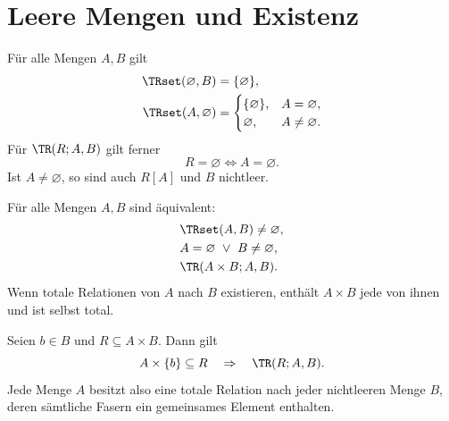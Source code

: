 \section{Leere Mengen und Existenz}

\begin{theorem}
\label{b04guide:thm:empty}
Für alle Mengen $A,B$ gilt
\[
 \begin{aligned}
 \TRset(\varnothing,B)&=\{\varnothing\},\\
 \TRset(A,\varnothing)&=
 \begin{cases}
   \{\varnothing\},& A=\varnothing,\\
   \varnothing,& A\ne\varnothing.
 \end{cases}
 \end{aligned}
\]
Für $\TR(R;A,B)$ gilt ferner
\[
 R=\varnothing\Longleftrightarrow A=\varnothing.
\]
Ist $A\ne\varnothing$, so sind auch $R[A]$ und $B$ nichtleer.
\end{theorem}

\begin{theorem}
\label{b04guide:thm:existence}
Für alle Mengen $A,B$ sind äquivalent:
\[
 \begin{aligned}
 &\TRset(A,B)\ne\varnothing,\\
 &A=\varnothing\ \lor\ B\ne\varnothing,\\
 &\TR(A\times B;A,B).
 \end{aligned}
\]
Wenn totale Relationen von $A$ nach $B$ existieren, enthält
$A\times B$ jede von ihnen und ist selbst total.
\end{theorem}

\begin{theorem}
\label{b04guide:thm:constant}
Seien $b\in B$ und $R\subseteq A\times B$. Dann gilt
\[
 A\times\{b\}\subseteq R\quad\Rightarrow\quad \TR(R;A,B).
\]
Jede Menge $A$ besitzt also eine totale Relation nach jeder
nichtleeren Menge $B$, deren sämtliche Fasern ein gemeinsames
Element enthalten.
\end{theorem}
